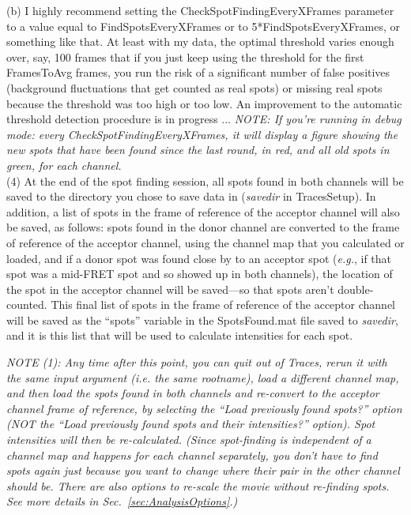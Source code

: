 \documentclass[11pt]{article}
\begin{document}
(b) I highly recommend setting the CheckSpotFindingEveryXFrames parameter to a value equal to FindSpotsEveryXFrames or to 5*FindSpotsEveryXFrames, or something like that.  At least with my data, the optimal threshold varies enough over, say, 100 frames that if you just keep using the threshold for the first FramesToAvg frames, you run the risk of a significant number of false positives (background fluctuations that get counted as real spots) or missing real spots because the threshold was too high or too low.  An improvement to the automatic threshold detection procedure is in progress ...  {\it NOTE: If you're running in debug mode: every CheckSpotFindingEveryXFrames, it will display a figure showing the new spots that have been found since the last round, in red, and all old spots in green, for each channel. }\\

\noindent (4) At the end of the spot finding session, all spots found in both channels will be saved to the directory you chose to save data in ({\it savedir} in TracesSetup).  In addition, a list of spots in the frame of reference of the acceptor channel will also be saved, as follows: spots found in the donor channel are converted to the frame of reference of the acceptor channel, using the channel map that you calculated or loaded, and if a donor spot was found close by to an acceptor spot ({\it e.g.}, if that spot was a mid-FRET spot and so showed up in both channels), the location of the spot in the acceptor channel will be saved---so that spots aren't double-counted.  This final list of spots in the frame of reference of the acceptor channel will be saved as the ``spots'' variable in the SpotsFound.mat file saved to {\it savedir}, and it is this list that will be used to calculate intensities for each spot.

{\it NOTE (1): Any time after this point, you can quit out of Traces, rerun it with the same input argument ({\it i.e.} the same rootname), load a different channel map, and then load the spots found in both channels and re-convert to the acceptor channel frame of reference, by selecting the ``Load previously found spots?'' option (NOT the ``Load previously found spots and their intensities?'' option).  Spot intensities will then be re-calculated. (Since spot-finding is independent of a channel map and happens for each channel separately, you don't have to find spots again just because you want to change where their pair in the other channel should be.  There are also options to re-scale the movie without re-finding spots.  See more details in Sec.~\ref{sec:AnalysisOptions}.)}
\end{document}
